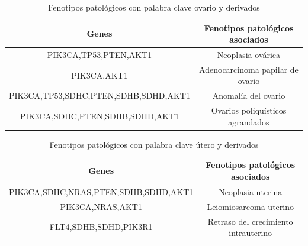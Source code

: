 \begin{table}[h]
	\centering
	\caption{Fenotipos patológicos con palabra clave ovario y derivados}
	\begin{tabular}{|c|c|}
		\hline
		\textbf{Genes} & \textbf{Fenotipos patológicos asociados} \\
		\hline
		PIK3CA,TP53,PTEN,AKT1 & Neoplasia ovárica \\
		\hline
		PIK3CA,AKT1 & Adenocarcinoma papilar de ovario \\
		\hline
		PIK3CA,TP53,SDHC,PTEN,SDHB,SDHD,AKT1 & Anomalía del ovario \\
		\hline
		PIK3CA,SDHC,PTEN,SDHB,SDHD,AKT1 & Ovarios poliquísticos agrandados \\
		\hline
	\end{tabular}
\end{table}

\begin{table}[h]
	\centering
	\caption{Fenotipos patológicos con palabra clave útero y derivados}
	\begin{tabular}{|c|c|}
		\hline
		\textbf{Genes} & \textbf{Fenotipos patológicos asociados} \\
		\hline
		PIK3CA,SDHC,NRAS,PTEN,SDHB,SDHD,AKT1 & Neoplasia uterina \\
		\hline
		PIK3CA,NRAS,AKT1 & Leiomiosarcoma uterino \\
		\hline
		FLT4,SDHB,SDHD,PIK3R1 & Retraso del crecimiento intrauterino \\
		\hline
	\end{tabular}
\end{table}
\clearpage
